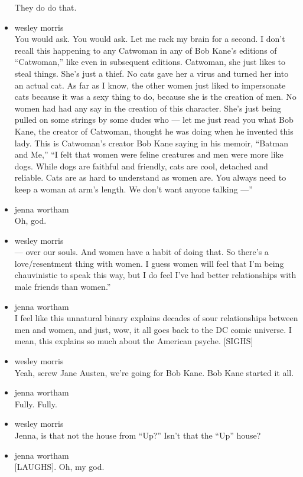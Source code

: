 \begin{itemize}
  They do do that.
\item
  wesley morris\\
  You would ask. You would ask. Let me rack my brain for a second. I
  don't recall this happening to any Catwoman in any of Bob Kane's
  editions of ``Catwoman,'' like even in subsequent editions. Catwoman,
  she just likes to steal things. She's just a thief. No cats gave her a
  virus and turned her into an actual cat. As far as I know, the other
  women just liked to impersonate cats because it was a sexy thing to
  do, because she is the creation of men. No women had had any say in
  the creation of this character. She's just being pulled on some
  strings by some dudes who --- let me just read you what Bob Kane, the
  creator of Catwoman, thought he was doing when he invented this lady.
  This is Catwoman's creator Bob Kane saying in his memoir, ``Batman and
  Me,'' ``I felt that women were feline creatures and men were more like
  dogs. While dogs are faithful and friendly, cats are cool, detached
  and reliable. Cats are as hard to understand as women are. You always
  need to keep a woman at arm's length. We don't want anyone talking
  ---''
\item
  jenna wortham\\
  Oh, god.
\item
  wesley morris\\
  --- over our souls. And women have a habit of doing that. So there's a
  love/resentment thing with women. I guess women will feel that I'm
  being chauvinistic to speak this way, but I do feel I've had better
  relationships with male friends than women.''
\item
  jenna wortham\\
  I feel like this unnatural binary explains decades of sour
  relationships between men and women, and just, wow, it all goes back
  to the DC comic universe. I mean, this explains so much about the
  American psyche. {[}SIGHS{]}
\item
  wesley morris\\
  Yeah, screw Jane Austen, we're going for Bob Kane. Bob Kane started it
  all.
\item
  jenna wortham\\
  Fully. Fully.
\item
  wesley morris\\
  Jenna, is that not the house from ``Up?'' Isn't that the ``Up'' house?
\item
  jenna wortham\\
  {[}LAUGHS{]}. Oh, my god.

\end{itemize}

